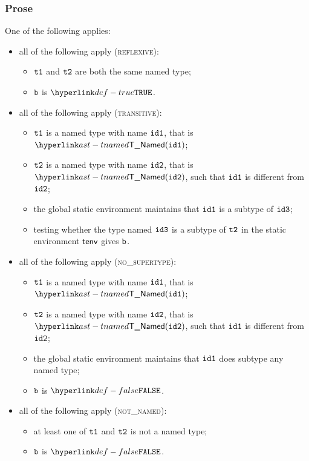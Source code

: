 \subsubsection{Prose}
One of the following applies:
\begin{itemize}
  \item all of the following apply (\textsc{reflexive}):
  \begin{itemize}
    \item $\texttt{t1}$ and $\texttt{t2}$ are both the same named type;
    \item $\texttt{b}$ is $\True$.
  \end{itemize}

  \item all of the following apply (\textsc{transitive}):
  \begin{itemize}
    \item $\texttt{t1}$ is a named type with name $\texttt{id1}$, that is $\TNamed(\idone)$;
    \item $\texttt{t2}$ is a named type with name $\texttt{id2}$, that is $\TNamed(\idtwo)$, such that $\texttt{id1}$ is different from $\texttt{id2}$;
    \item the global static environment maintains that $\texttt{id1}$ is a subtype of $\texttt{id3}$;
    \item testing whether the type named $\texttt{id3}$ is a subtype of $\texttt{t2}$ in the static environment $\textsf{tenv}$
    gives $\texttt{b}$.
  \end{itemize}

  \item all of the following apply (\textsc{no\_supertype}):
  \begin{itemize}
    \item $\texttt{t1}$ is a named type with name $\texttt{id1}$, that is $\TNamed(\idone)$;
    \item $\texttt{t2}$ is a named type with name $\texttt{id2}$, that is $\TNamed(\idtwo)$, such that $\texttt{id1}$ is different from $\texttt{id2}$;
    \item the global static environment maintains that $\texttt{id1}$ does subtype any named type;
    \item $\texttt{b}$ is $\False$.
  \end{itemize}

  \item all of the following apply (\textsc{not\_named}):
  \begin{itemize}
    \item at least one of $\texttt{t1}$ and $\texttt{t2}$ is not a named type;
    \item $\texttt{b}$ is $\False$.
  \end{itemize}
\end{itemize}

